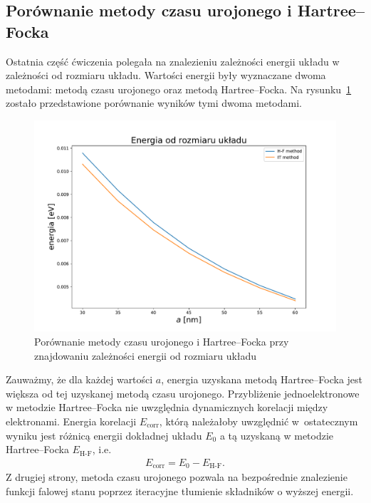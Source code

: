 \documentclass{article}
\begin{document}
\subsection{Porównanie metody czasu urojonego i Hartree--Focka}
Ostatnia część ćwiczenia polegała na znalezieniu zależności energii układu w zależności od rozmiaru układu.
Wartości energii były wyznaczane dwoma metodami: metodą czasu urojonego oraz metodą Hartree--Focka.
Na rysunku~\ref{fig:comparison hf it} zostało przedstawione porównanie wyników tymi dwoma metodami.
\begin{figure}[htp!]
    \centering
    \includegraphics[width=0.75\linewidth]{ex2_4_energies.pdf}
    \caption{Porównanie metody czasu urojonego i Hartree--Focka przy znajdowaniu zależności energii od rozmiaru układu}
    \label{fig:comparison hf it}
\end{figure}
Zauważmy, że dla każdej wartości $a$, energia uzyskana metodą Hartree–Focka jest większa od tej uzyskanej metodą czasu urojonego. 
Przybliżenie jednoelektronowe w metodzie Hartree--Focka nie uwzględnia dynamicznych korelacji między elektronami.
Energia korelacji $E_{\text{corr}}$, którą należałoby uwzględnić w~ostatecznym wyniku jest różnicą energii dokładnej układu $E_0$ a tą uzyskaną w metodzie Hartree--Focka $E_{\text{H-F}}$, i.e.
\begin{gather}
    E_{\text{corr}} = E_0 - E_{\text{H-F}}.
\end{gather}
Z drugiej strony, metoda czasu urojonego pozwala na bezpośrednie znalezienie funkcji falowej stanu poprzez iteracyjne tłumienie składników o wyższej energii.
\end{document}
